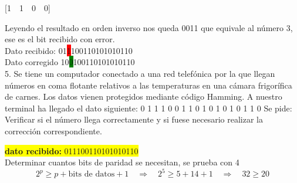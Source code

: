 \documentclass{article}
\begin{document}
	\begin{center}
		\vspace{0.5cm}
		[1~~1~~0~~0]\\
	\end{center}	
	\vspace{0.5cm}
	Leyendo el resultado en orden inverso nos queda 0011 que equivale al número 3, ese es el bit recibido con error.\\
	Dato recibido: 01\colorbox{red}{1}100110101010110\\
	Dato corregido 10\colorbox{green}{0}100110101010110\\
		
	\vspace{1cm}
	5. Se tiene un computador conectado a una red telefónica por la que llegan números en
	coma flotante relativos a las temperaturas en una cámara frigorífica de carnes. Los
	datos vienen protegidos mediante código Hamming. A nuestro terminal ha llegado
	el dato siguiente: 0 1 1 1 0 0 1 1 0 1 0 1 0 1 0 1 1 0
	Se pide: Verificar si el número llega correctamente y si fuese necesario realizar la
	corrección correspondiente.

	\begin{center}
		\hspace{3cm}\colorbox{yellow}{{\textbf{dato recibido:} 011100110101010110}}\newline
		\\Determinar cuantos bits de paridad se necesitan, se prueba con 4
		\[
		2^p \geq p + \text{bits de datos} + 1
		\quad \Rightarrow \quad	2^5 \geq 5 + 14 + 1 \quad \Rightarrow \quad 32 \geq 20
		\]
	\end{center}
	
\end{document}
